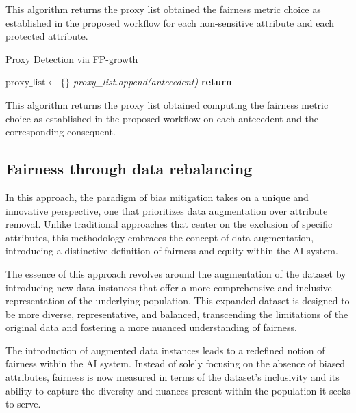 \documentclass[12pt,a4paper,openright,twoside]{book}
\begin{document}
This algorithm returns the proxy list obtained the fairness metric choice as established in the proposed workflow for each non-sensitive attribute and each protected attribute.

\begin{algorithm}[H]
    \caption{Proxy Detection via FP-growth}
    \label{alg:proxy_detection_fp_growth}
    \begin{algorithmic}[1]
        \State $\text{proxy\_list} \gets \{\}$ 
                    \State \textit{proxy\_list.append(antecedent)}
                \EndIf
            \EndFor
        \EndFor
        \State \textbf{return} 
    \end{algorithmic}
\end{algorithm}

This algorithm returns the proxy list obtained computing the fairness metric choice as established in the proposed workflow on each antecedent and the corresponding consequent.

\subsection{Fairness through data rebalancing}

In this approach, the paradigm of bias mitigation takes on a unique and innovative perspective, one that prioritizes data augmentation over attribute removal. Unlike traditional approaches that center on the exclusion of specific attributes, this methodology embraces the concept of data augmentation, introducing a distinctive definition of fairness and equity within the AI system.

The essence of this approach revolves around the augmentation of the dataset by introducing new data instances that offer a more comprehensive and inclusive representation of the underlying population. This expanded dataset is designed to be more diverse, representative, and balanced, transcending the limitations of the original data and fostering a more nuanced understanding of fairness. 

The introduction of augmented data instances leads to a redefined notion of fairness within the AI system. Instead of solely focusing on the absence of biased attributes, fairness is now measured in terms of the dataset's inclusivity and its ability to capture the diversity and nuances present within the population it seeks to serve. 
\end{document}
